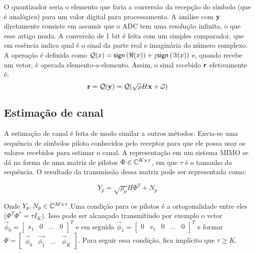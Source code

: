 \documentclass{article}
\begin{document}
	O quantizador seria o elemento que faria a conversão da recepção do símbolo (que é analógica) para um valor digital para processamento. A análise com $\mathbf{y}$ diretamente consiste em assumir que o ADC tem uma resolução infinita, o que esse artigo muda. A conversão de 1 bit é feita com um simples comparador, que em essência indica qual é o sinal da parte real e imaginária do número complexo. A operação é definida como $\mathcal{Q}(x)= \mathsf{sign} \left( \Re(x) \right) +j \mathsf{sign} \left( \Im(x) \right) $ e, quando recebe um vetor, é operada elemento-a-elemento. Assim, o sinal recebido $\mathbf{r}$ efetivamente é:
	\begin{equation}
		\mathbf{r}=\mathcal{Q}(\mathbf{y})=\mathcal{Q}(\sqrt{\rho}H\mathbf{x}+\vec{\omega})
		\label{eq:sinal_recebido_quantizado}
	\end{equation}

	\subsection{Estimação de canal}
	
	A estimação de canal é feita de modo similar a outros métodos: Envia-se uma sequência de símbolos piloto conhecidos pelo receptor para que ele possa usar os valores recebidos para estimar o canal. A representação em um sistema MIMO se dá na forma de uma matriz de pilotos $\Phi\in\mathbb{C}^{K\times \tau}$, em que $\tau$ é o tamanho da sequência. O resultado da transmissão dessa matriz pode ser representada como:

	\begin{equation}
		Y_p = \sqrt{\rho_p}H\Phi^T+N_p
		\label{eq:recepcao_sinal_treinamento}
	\end{equation}

	Onde $Y_p,N_p\in\mathbb{C}^{M\times \tau}$.Uma condição para os pilotos é a ortogonalidade entre eles ($\Phi^T\Phi^*=\tau I_K$). Isso pode ser alcançado transmitindo por exemplo o vetor $\vec{\phi}_0=\begin{bmatrix}s_1&0&\dots&0\end{bmatrix}^T$ e em seguida $\vec{\phi}_1=\begin{bmatrix}0&s_1&0&\dots&0\end{bmatrix}^T$ e formar $\Phi=\begin{bmatrix}\vec{\phi}_0&\vec{\phi_1}&\dots&\vec{\phi}_K\end{bmatrix}$. Para seguir essa condição, fica implícito que $\tau\ge K$.  
	
\end{document}
